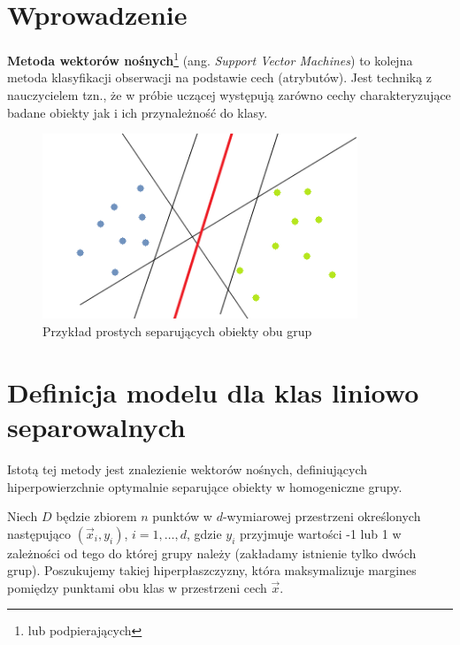 \documentclass[
]{book}
\theoremstyle{plain}
\theoremstyle{definition}
\theoremstyle{definition}
\theoremstyle{definition}
\theoremstyle{definition}
\theoremstyle{definition}
\theoremstyle{remark}
\begin{document}
\section{Wprowadzenie}\label{wprowadzenie}

\textbf{Metoda wektorów nośnych}\footnote{lub podpierających} (ang. \emph{Support Vector Machines}) to kolejna metoda klasyfikacji obserwacji na podstawie cech (atrybutów). Jest techniką z nauczycielem tzn., że w próbie uczącej występują zarówno cechy charakteryzujące badane obiekty jak i ich przynależność do klasy.

\begin{figure}

{\centering \includegraphics[width=3.71in]{images/SVM_Example_of_Hyperplanes} 

}

\caption{Przykład prostych separujących obiekty obu grup}\label{fig:svm1}
\end{figure}

\section{Definicja modelu dla klas liniowo separowalnych}\label{definicja-modelu-dla-klas-liniowo-separowalnych}

Istotą tej metody jest znalezienie wektorów nośnych, definiujących hiperpowierzchnie optymalnie separujące obiekty w homogeniczne grupy.

Niech \(D\) będzie zbiorem \(n\) punktów w \(d\)-wymiarowej przestrzeni określonych następująco \((\vec{x}_i, y_i)\), \(i=1,\ldots, d\), gdzie \(y_i\) przyjmuje wartości -1 lub 1 w zależności od tego do której grupy należy (zakładamy istnienie tylko dwóch grup). Poszukujemy takiej hiperpłaszczyzny, która maksymalizuje margines pomiędzy punktami obu klas w przestrzeni cech \(\vec{x}\).
\end{document}
